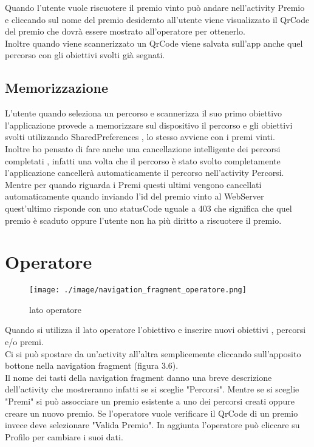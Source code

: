 Quando l'utente vuole riscuotere il premio vinto può andare nell'activity Premio e cliccando sul nome del premio desiderato all'utente viene visualizzato il QrCode del premio che dovrà essere mostrato all'operatore per ottenerlo.\\
Inoltre quando viene scannerizzato un QrCode viene salvata sull'app anche quel percorso con gli obiettivi svolti già segnati.

\subsection{Memorizzazione}
\vspace{2em}

L'utente quando seleziona un percorso e scannerizza il suo primo obiettivo l'applicazione provede a memorizzare sul dispositivo il percorso e gli obiettivi svolti utilizzando SharedPreferences , lo stesso avviene con i premi vinti.\\ 
Inoltre ho pensato di fare anche una cancellazione intelligente dei percorsi completati , infatti una volta che il percorso è stato svolto completamente l'applicazione cancellerà automaticamente il percorso nell'activity Percorsi.
Mentre per quando riguarda i Premi questi ultimi vengono cancellati automaticamente quando inviando l'id del premio vinto al WebServer quest'ultimo risponde con uno statusCode uguale a 403 che significa che quel premio è scaduto oppure l'utente non ha più diritto a riscuotere il premio.

\clearpage
\section{Operatore}
\vspace{2em}

\begin{wrapfigure}{L}{0.45\textwidth}
\centering
\texttt{[image: ./image/navigation\_fragment\_operatore.png]}
\caption{\label{fig:login}lato operatore}
\end{wrapfigure}

Quando si utilizza il lato operatore l'obiettivo e inserire nuovi obiettivi , percorsi e/o premi.\\[0.2cm]
Ci si può spostare da un'activity all'altra semplicemente cliccando sull'apposito bottone nella navigation fragment (figura 3.6).\\[0.2cm]
Il nome dei tasti della navigation fragment danno una breve descrizione dell'activity che mostreranno infatti se si sceglie "Percorsi".
Mentre se si sceglie "Premi" si può assocciare un premio esistente a uno dei percorsi creati oppure creare un nuovo premio.
Se l'operatore vuole verificare il QrCode di un premio invece deve selezionare "Valida Premio".
In aggiunta l'operatore può cliccare su Profilo per cambiare i suoi dati.



